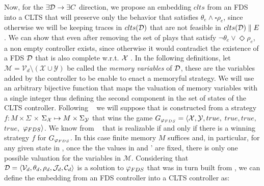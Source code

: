 Now,  for the $\exists \mathcal{D} \rightarrow \exists C$ direction, we propose an embedding $clts$ from an FDS into a CLTS that will preserve only the behavior that satisfies $\theta_e \wedge \square \rho_e$, since otherwise we will be keeping traces in $clts(\mathcal{D})$ that are not feasible in $clts(\mathcal{D})\parallel E$. We can show that even after removing the set of plays that satisfy $\neg \theta_e \vee \Diamond \rho_e$, a non empty controller exists, since otherwise it would contradict the existence of a FDS $\mathcal{D}$ that is also complete w.r.t. ${\mathcal{X}}$ . In the following definitions, let $\mathcal{M}= \mathcal{V}_d\setminus (\mathcal{X} \cup \mathcal{Y})$ be called the \emph{memory variables} of $\mathcal{D}$, these are the variables added by the controller to be enable to enact a memoryful strategy. We will use an arbitrary bijective function \enumSetDef that maps the valuation of memory variables with a single integer thus defining the second component in the set of states of the CLTS controller. 
Following ~\cite{bloem2012synthesis} we will suppose that \fdsD is constructed from a strategy $f: M \times \Sigma$ $\times$ $\Sigma_{{\mathcal{X}}} \mapsto M \times \Sigma_{{\mathcal{Y}}}$
that wins the game $G_{\varphi_{FDS}}=\langle {\ensuremath{\mathcal{X}}}, {\mathcal{Y}}, true,$ $true, true,$ $true,$ $\varphi_{FDS} \rangle$. We know from ~\cite{bloem2012synthesis} that \varphiLTL is realizable if and only if there is a winning strategy $f$ for $G_{\varphi_{FDS}}$. In this case finite memory $M$ suffices and, in particular, for any given state in \fdsD, once the the values in \gsV and \gsX' are fixed, there is only one possible valuation for the variables in $\mathcal{M}$. 
Considering that $\mathcal{D}= \langle \mathcal{V}_d, \theta_d, \rho_d, \mathcal{J}_d, \mathcal{C}_d\rangle$ is a solution to $\varphi_{FDS}$ that was in turn built from \controlProblemDef, we can define the embedding from an FDS controller \fdsD into a CLTS controller \cltsEmbeddingDef{\fdsD}  as:


